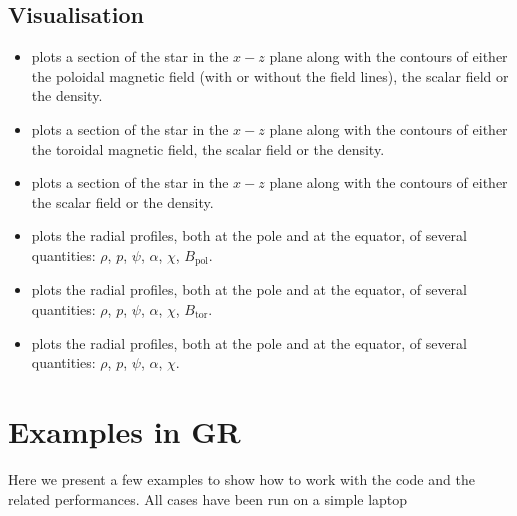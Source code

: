\documentclass[letterpaper,10pt,english]{sphinxmanual}
\begin{document}
\section{Visualisation}
\label{\detokenize{files_outputs:visualisation}}\begin{itemize}
\item {} 
\sphinxAtStartPar
{} \sphinxhyphen{} plots a section of the star in the \(x-z\) plane along with the contours of either the poloidal magnetic field (with or without the field lines), the scalar field or the density.

\item {} 
\sphinxAtStartPar
{} \sphinxhyphen{} plots a section of the star in the \(x-z\) plane along with the contours of either the toroidal magnetic field, the scalar field or the density.

\item {} 
\sphinxAtStartPar
{} \sphinxhyphen{} plots a section of the star in the \(x-z\) plane along with the contours of either the scalar field or the density.

\item {} 
\sphinxAtStartPar
{} \sphinxhyphen{} plots the radial profiles, both at the pole and at the equator, of several quantities: \(\rho\), \(p\), \(\psi\), \(\alpha\), \(\chi\), \(B_\mathrm{pol}\).

\item {} 
\sphinxAtStartPar
{} \sphinxhyphen{} plots the radial profiles, both at the pole and at the equator, of several quantities: \(\rho\), \(p\), \(\psi\), \(\alpha\), \(\chi\), \(B_\mathrm{tor}\).

\item {} 
\sphinxAtStartPar
{} \sphinxhyphen{} plots the radial profiles, both at the pole and at the equator, of several quantities: \(\rho\), \(p\), \(\psi\), \(\alpha\), \(\chi\).

\end{itemize}


\chapter{Examples in GR}
\label{\detokenize{examples_gr:examples-in-gr}}\label{\detokenize{examples_gr::doc}}
\sphinxAtStartPar
Here we present a few examples to show how to work with the code and the related performances. All
cases have been run on a simple laptop
\end{document}
